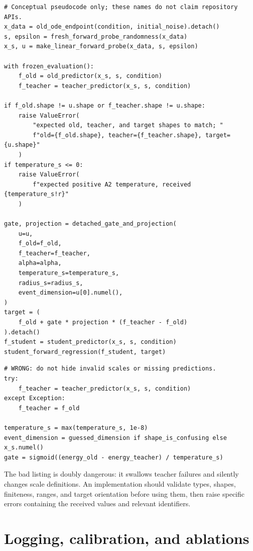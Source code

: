 \documentclass[11pt,a4paper]{article}
\theoremstyle{plain}
\theoremstyle{definition}
\begin{document}
\begin{lstlisting}[style=goodpython,caption={Good high-level A2 blueprint with explicit invariant checks.}]
# Conceptual pseudocode only; these names do not claim repository APIs.
x_data = old_ode_endpoint(condition, initial_noise).detach()
s, epsilon = fresh_forward_probe_randomness(x_data)
x_s, u = make_linear_forward_probe(x_data, s, epsilon)

with frozen_evaluation():
    f_old = old_predictor(x_s, s, condition)
    f_teacher = teacher_predictor(x_s, s, condition)

if f_old.shape != u.shape or f_teacher.shape != u.shape:
    raise ValueError(
        "expected old, teacher, and target shapes to match; "
        f"old={f_old.shape}, teacher={f_teacher.shape}, target={u.shape}"
    )
if temperature_s <= 0:
    raise ValueError(
        f"expected positive A2 temperature, received {temperature_s!r}"
    )

gate, projection = detached_gate_and_projection(
    u=u,
    f_old=f_old,
    f_teacher=f_teacher,
    alpha=alpha,
    temperature_s=temperature_s,
    radius_s=radius_s,
    event_dimension=u[0].numel(),
)
target = (
    f_old + gate * projection * (f_teacher - f_old)
).detach()
f_student = student_predictor(x_s, s, condition)
student_forward_regression(f_student, target)
\end{lstlisting}

\begin{lstlisting}[style=badpython,caption={Bad: silent fallbacks erase the method's declared statistical meaning.}]
# WRONG: do not hide invalid scales or missing predictions.
try:
    f_teacher = teacher_predictor(x_s, s, condition)
except Exception:
    f_teacher = f_old

temperature_s = max(temperature_s, 1e-8)
event_dimension = guessed_dimension if shape_is_confusing else x_s.numel()
gate = sigmoid((energy_old - energy_teacher) / temperature_s)
\end{lstlisting}

The bad listing is doubly dangerous: it swallows teacher failures and silently changes scale
definitions.  An implementation should validate types, shapes, finiteness, ranges, and target
orientation before using them, then raise specific errors containing the received values and
relevant identifiers.

\section{Logging, calibration, and ablations}
\label{sec:logging}
\end{document}
